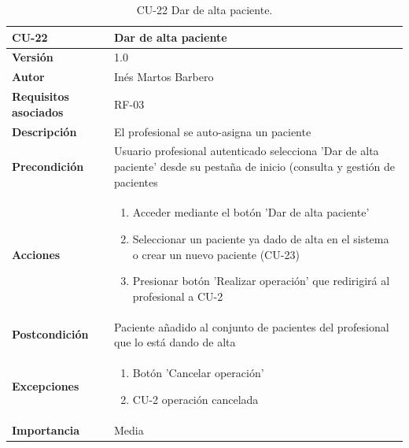 \begin{table}[p]
	\centering
	\begin{tabularx}{\linewidth}{ p{} p{} }
		\toprule
		\textbf{CU-22}    & \textbf{Dar de alta paciente}\\
		\toprule
		\textbf{Versión}              & 1.0    \\
		\textbf{Autor}                & Inés Martos Barbero \\
		\textbf{Requisitos asociados} & RF-03 \\
		\textbf{Descripción}          & El profesional se auto-asigna un paciente \\
		\textbf{Precondición}         & Usuario profesional autenticado selecciona 'Dar de alta paciente' desde su pestaña de inicio (consulta y gestión de pacientes \\
		\textbf{Acciones}             &
		\begin{enumerate}
			\def\labelenumi{\arabic{enumi}.}
			\tightlist
			\item Acceder mediante el botón 'Dar de alta paciente'
			\item Seleccionar un paciente ya dado de alta en el sistema o crear un nuevo paciente (CU-23)
            \item Presionar botón 'Realizar operación' que redirigirá al profesional a CU-2
		\end{enumerate}\\
		\textbf{Postcondición}        & Paciente añadido al conjunto de pacientes del profesional que lo está dando de alta \\
		\textbf{Excepciones}          & 
        \begin{enumerate}
			\def\labelenumi{\arabic{enumi}.}
			\tightlist
			\item Botón 'Cancelar operación'
            \item CU-2 operación cancelada
		\end{enumerate}\\
		\textbf{Importancia}          & Media\
		\bottomrule
	\end{tabularx}
	\caption{CU-22 Dar de alta paciente.}
\end{table}


